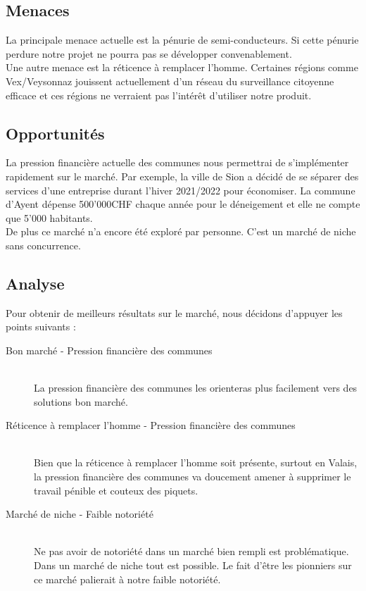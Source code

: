 \subsection{Menaces}
La principale menace actuelle est la pénurie de semi-conducteurs. Si cette pénurie perdure
notre projet ne pourra pas se développer convenablement.\\
Une autre menace est la réticence à remplacer l'homme. Certaines régions comme Vex/Veysonnaz
jouissent actuellement d'un réseau du surveillance citoyenne efficace et ces régions
ne verraient pas l'intérêt d'utiliser notre produit.

\subsection{Opportunités}
La pression financière actuelle des communes nous permettrai de s'implémenter rapidement
sur le marché. Par exemple, la ville de Sion a décidé de se séparer des services d'une entreprise
durant l'hiver 2021/2022 pour économiser. La commune d'Ayent dépense 500'000CHF chaque année pour
le déneigement et elle ne compte que 5'000 habitants.\\
De plus ce marché n'a encore été exploré par personne. C'est un marché de niche sans concurrence.

\subsection{Analyse}
Pour obtenir de meilleurs résultats sur le marché, nous décidons d'appuyer les points suivants :
\begin{description}
    \item[Bon marché - Pression financière des communes] \hfill \\
    La pression financière des communes les orienteras plus facilement vers des solutions
    bon marché. 
    \item[Réticence à remplacer l'homme - Pression financière des communes] \hfill \\
    Bien que la réticence à remplacer l'homme soit présente, surtout en Valais, la pression
    financière des communes va doucement amener à supprimer le travail pénible et couteux des piquets.
    \item[Marché de niche - Faible notoriété] \hfill \\ 
    Ne pas avoir de notoriété dans un marché bien rempli est problématique. Dans un marché de niche
    tout est possible. Le fait d'être les pionniers sur ce marché palierait à notre faible notoriété.
\end{description}

